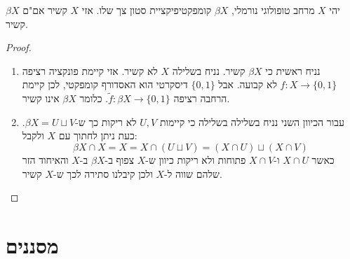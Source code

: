 \documentclass{tstextbook}
\begin{document}
\begin{proposition}
יהי \(X\) מרחב טופולוגי נורמלי, \(\beta X\) קומפקטיפיקציית סטון צך שלו. אזי \(X\) קשיר אם"ם \(\beta X\) קשיר.

\end{proposition}
\begin{proof}
  \begin{enumerate}
    \item נניח ראשית כי \(\beta X\) קשיר. נניח בשלילה \(X\) לא קשיר. אזי קיימת פונקציה רציפה \(f:X\to \{ 0,1 \}\) לא קבועה. אבל \(\{ 0,1 \}\) דיסקרטי הוא האסדורף קומפקטי, לכן קיימת הרחבה רציפה \(\tilde{f}:\beta X\to \{ 0,1 \}\). כלומר \(\beta X\) אינו קשיר. 


    \item עבור הכיוון השני נניח בשלילה בשלילה כי קיימות \(U,V\) לא ריקות כך ש-\(\beta X=U\sqcup V\). כעת ניתן לחתוך עם \(X\) ולקבל: 
$$\beta X\cap X=X=X\cap\left(  U\sqcup V \right)=\left( X\cap U \right)\sqcup \left( X\cap V \right)$$
כאשר \(X\cap U\) ו-\(X\cap V\) פתוחות ולא ריקות כיוון ש-\(X\) צפוף ב-\(\beta X\) ב-\(X\) והאיחוד הזר שלהם שווה ל-\(X\) ולכן קיבלנו סתירה לכך ש-\(X\) קשיר.


  \end{enumerate}
\end{proof}
\section{מסננים}
\end{document}

